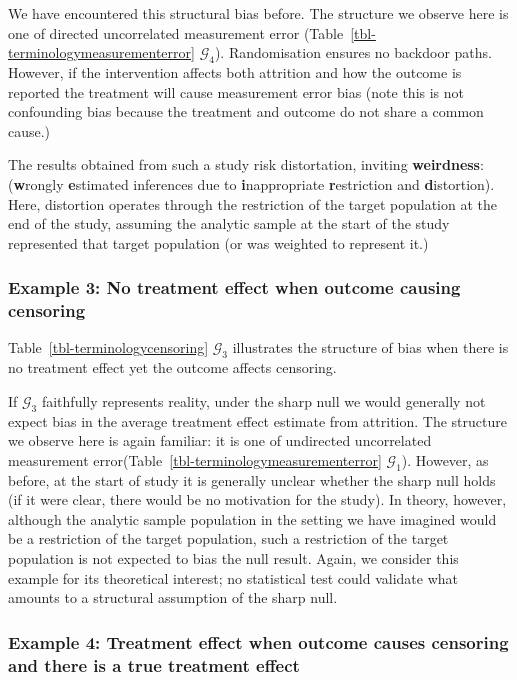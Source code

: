\documentclass[
  single column]{article}
\begin{document}
We have encountered this structural bias before. The structure we
observe here is one of directed uncorrelated measurement error
(Table~\ref{tbl-terminologymeasurementerror} \(\mathcal{G}_4\)).
Randomisation ensures no backdoor paths. However, if the intervention
affects both attrition and how the outcome is reported the treatment
will cause measurement error bias (note this is not confounding bias
because the treatment and outcome do not share a common cause.)

The results obtained from such a study risk distortation, inviting
\textbf{weirdness}: (\textbf{w}rongly \textbf{e}stimated inferences due
to \textbf{i}nappropriate \textbf{r}estriction and \textbf{d}istortion).
Here, distortion operates through the restriction of the target
population at the end of the study, assuming the analytic sample at the
start of the study represented that target population (or was weighted
to represent it.)

\subsubsection{Example 3: No treatment effect when outcome causing
censoring}\label{example-3-no-treatment-effect-when-outcome-causing-censoring}

Table~\ref{tbl-terminologycensoring} \(\mathcal{G}_3\) illustrates the
structure of bias when there is no treatment effect yet the outcome
affects censoring.

If \(\mathcal{G}_3\) faithfully represents reality, under the sharp null
we would generally not expect bias in the average treatment effect
estimate from attrition. The structure we observe here is again
familiar: it is one of undirected uncorrelated measurement
error(Table~\ref{tbl-terminologymeasurementerror} \(\mathcal{G}_1\)).
However, as before, at the start of study it is generally unclear
whether the sharp null holds (if it were clear, there would be no
motivation for the study). In theory, however, although the analytic
sample population in the setting we have imagined would be a restriction
of the target population, such a restriction of the target population is
not expected to bias the null result. Again, we consider this example
for its theoretical interest; no statistical test could validate what
amounts to a structural assumption of the sharp null.

\subsubsection{Example 4: Treatment effect when outcome causes censoring
and there is a true treatment
effect}\label{example-4-treatment-effect-when-outcome-causes-censoring-and-there-is-a-true-treatment-effect}
\end{document}
